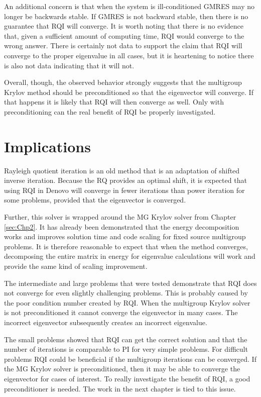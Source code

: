 An additional concern is that when the system is ill-conditioned GMRES may no longer be backwards stable. If GMRES is not backward stable, then there is no guarantee that RQI will converge. It is worth noting that there is no evidence that, given a sufficient amount of computing time, RQI would converge to the wrong answer. There is certainly not data to support the claim that RQI will converge to the proper eigenvalue in all cases, but it is heartening to notice there is also not data indicating that it will not. 

Overall, though, the observed behavior strongly suggests that the multigroup Krylov method should be preconditioned so that the eigenvector will converge. If that happens it is likely that RQI will then converge as well. Only with preconditioning can the real benefit of RQI be properly investigated.

\section{Implications}
Rayleigh quotient iteration is an old method that is an adaptation of shifted inverse iteration. Because the RQ provides an optimal shift, it is expected that using RQI in Denovo will converge in fewer iterations than power iteration for some problems, provided that the eigenvector is converged. 

Further, this solver is wrapped around the MG Krylov solver from Chapter \ref{sec:Chp2}. It has already been demonstrated that the energy decomposition works and improves solution time and code scaling for fixed source multigroup problems. It is therefore reasonable to expect that when the method converges, decomposing the entire matrix in energy for eigenvalue calculations will work and provide the same kind of scaling improvement.

The intermediate and large problems that were tested demonstrate that RQI does not converge for even slightly challenging problems. This is probably caused by the poor condition number created by RQI. When the multigroup Krylov solver is not preconditioned it cannot converge the eigenvector in many cases. The incorrect eigenvector subsequently creates an incorrect eigenvalue. 

The small problems showed that RQI can get the correct solution and that the number of iterations is comparable to PI for very simple problems. For difficult problems RQI could be beneficial if the multigroup iterations can be converged. If the MG Krylov solver is preconditioned, then it may be able to converge the eigenvector for cases of interest. To really investigate the benefit of RQI, a good preconditioner is needed. The work in the next chapter is tied to this issue.

